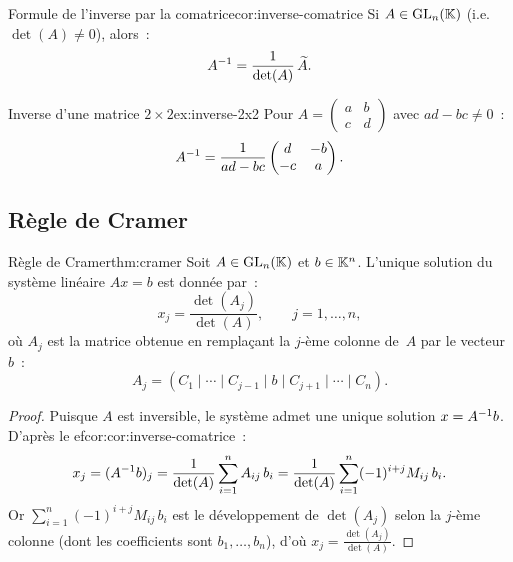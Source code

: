 \begin{corollary}{Formule de l'inverse par la comatrice}{cor:inverse-comatrice}
  Si $A\in\operatorname{GL}_n({\mathbb{K}})$ (i.e.\ $\det(A)\neq 0$), alors~:
  \[
    {A}^{-1}=\frac{1}{\det(A)}\,\widetilde{A}.
  \]
\end{corollary}

\begin{example}{Inverse d'une matrice $2\times 2$}{ex:inverse-2x2}
  Pour $A=\begin{pmatrix}a&b\\c&d\end{pmatrix}$ avec $ad-bc\neq 0$~:
  \[
    {A}^{-1}=\frac{1}{ad-bc}\begin{pmatrix}d&-b\\-c&a\end{pmatrix}.
  \]
\end{example}

\subsection{Règle de Cramer}\label{subsec:cramer}

\begin{theorem}{Règle de Cramer}{thm:cramer}
  Soit $A\in\operatorname{GL}_n({\mathbb{K}})$ et $b\in{\mathbb{K}}^n$. L'unique solution du système
  linéaire $Ax=b$ est donnée par~:
  \[
    x_j=\frac{\det(A_j)}{\det(A)},\qquad j=1,\ldots,n,
  \]
  où $A_j$ est la matrice obtenue en remplaçant la $j$-ème colonne
  de~$A$ par le vecteur~$b$~:
  \[
    A_j=(C_1\mid\cdots\mid C_{j-1}\mid b\mid C_{j+1}\mid\cdots\mid C_n).
  \]
\end{theorem}

\begin{proof}
  Puisque $A$ est inversible, le système admet une unique solution
  $x={A}^{-1}b$. D'après le 
ef{cor:cor:inverse-comatrice}~:
  \[
    x_j=({A}^{-1}b)_j=\frac{1}{\det(A)}\sum_{i=1}^{n}A_{ij}\,b_i
    =\frac{1}{\det(A)}\sum_{i=1}^{n}(-1)^{i+j}M_{ij}\,b_i.
  \]
  Or $\sum_{i=1}^n(-1)^{i+j}M_{ij}\,b_i$ est le développement de
  $\det(A_j)$ selon la $j$-ème colonne (dont les coefficients sont
  $b_1,\ldots,b_n$), d'où $x_j=\frac{\det(A_j)}{\det(A)}$.
\end{proof}

